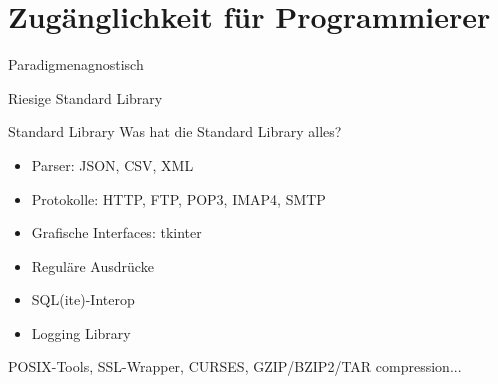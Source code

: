 \documentclass{beamer}
\begin{document}
\section{Zug\"anglichkeit f\"ur Programmierer}

\begin{frame}
\begin{center}
\Huge Paradigmenagnostisch
\end{center}
\end{frame}

\begin{frame}
\begin{center}
\Huge Riesige Standard Library
\end{center}
\end{frame}

\begin{frame}{Standard Library}
Was hat die Standard Library alles?
\begin{itemize}
\item Parser: JSON, CSV, XML
\item Protokolle: HTTP, FTP, POP3, IMAP4, SMTP
\item Grafische Interfaces: tkinter
\item Regul\"are Ausdr\"ucke
\item SQL(ite)-Interop
\item Logging Library
\end{itemize}
POSIX-Tools, SSL-Wrapper, CURSES, GZIP/BZIP2/TAR compression...
\end{frame}
\end{document}
